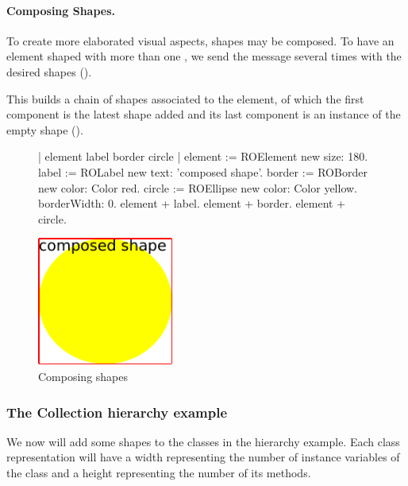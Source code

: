 \documentclass[a4paper,10pt,twoside]{book}
\begin{document}
\paragraph{Composing Shapes.}
To create more elaborated visual aspects, shapes may be composed. To have an element shaped with more than one , we send the \ct{+} message several times with the desired shapes (). 

This builds a chain of shapes associated to the element, of which the first component is the latest shape added and its last component is an instance of the empty shape ().

\begin{figure}[H]
      \begin{minipage}[t]{0.6\textwidth}
      \vspace{0pt}
     \begin{code}{}
| element label border circle | 
element := ROElement new size: 180.				
label := ROLabel new text: 'composed shape'.
border := ROBorder new color: Color red. 
circle := ROEllipse new 
			color: Color yellow.
			borderWidth: 0.			
element + label.
element + border.
element + circle.\end{code}
\end{minipage}
\hfill
\begin{minipage}[t]{0.4\textwidth}
      \vspace{0pt} \raggedright
       \centering
		\includegraphics[width=0.4\textwidth]{composed}
   \end{minipage}
\caption{Composing shapes}
\label{fig:composed}
\end{figure} 

\subsubsection{The Collection hierarchy example}
We now will add some shapes to the classes in the  hierarchy example. Each class representation will have a width representing the number of instance variables of the class and a height representing the number of its methods. 
\end{document}
